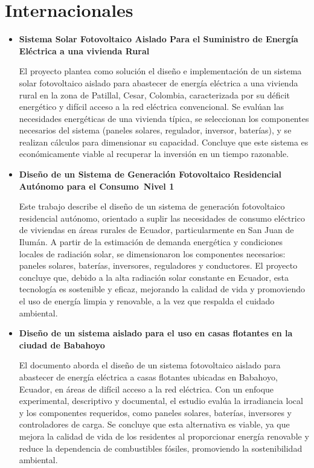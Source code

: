 \section{Internacionales}

\begin{itemize}
  
  \item \textbf{Sistema Solar Fotovoltaico Aislado Para el Suministro de Energía Eléctrica a una vivienda Rural \parencite{Mestre}}

El proyecto plantea como solución el diseño e implementación de un sistema solar fotovoltaico aislado para abastecer de energía eléctrica a una vivienda rural en la zona de Patillal, Cesar, Colombia, caracterizada por su déficit energético y difícil acceso a la red eléctrica convencional. Se evalúan las necesidades energéticas de una vivienda típica, se seleccionan los componentes necesarios del sistema (paneles solares, regulador, inversor, baterías), y se realizan cálculos para dimensionar su capacidad. Concluye que este sistema es económicamente viable al recuperar la inversión en un tiempo razonable.

  \item \textbf{Diseño de un Sistema de Generación Fotovoltaico Residencial Autónomo para el Consumo Nivel 1 \parencite{Dominguez}}

Este trabajo describe el diseño de un sistema de generación fotovoltaico residencial autónomo, orientado a suplir las necesidades de consumo eléctrico de viviendas en áreas rurales de Ecuador, particularmente en San Juan de Ilumán. A partir de la estimación de demanda energética y condiciones locales de radiación solar, se dimensionaron los componentes necesarios: paneles solares, baterías, inversores, reguladores y conductores. El proyecto concluye que, debido a la alta radiación solar constante en Ecuador, esta tecnología es sostenible y eficaz, mejorando la calidad de vida y promoviendo el uso de energía limpia y renovable, a la vez que respalda el cuidado ambiental.

  \item \textbf{Diseño de un sistema aislado para el uso en casas flotantes en la ciudad de Babahoyo \parencite{Puco}}

El documento aborda el diseño de un sistema fotovoltaico aislado para abastecer de energía eléctrica a casas flotantes ubicadas en Babahoyo, Ecuador, en áreas de difícil acceso a la red eléctrica. Con un enfoque experimental, descriptivo y documental, el estudio evalúa la irradiancia local y los componentes requeridos, como paneles solares, baterías, inversores y controladores de carga. Se concluye que esta alternativa es viable, ya que mejora la calidad de vida de los residentes al proporcionar energía renovable y reduce la dependencia de combustibles fósiles, promoviendo la sostenibilidad ambiental.

\end{itemize}


